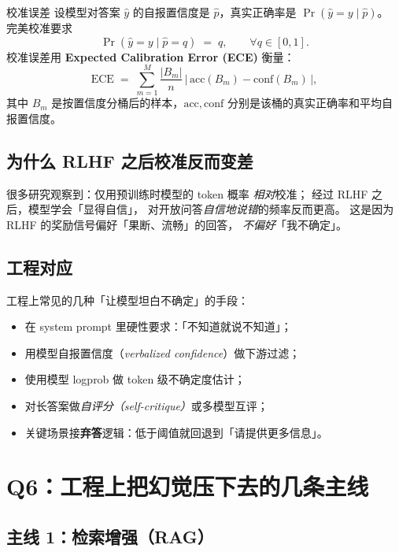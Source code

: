 \documentclass[11pt,a4paper]{ctexart}
\begin{document}
\begin{mathbox}{校准误差}
设模型对答案 $\hat y$ 的自报置信度是 $\hat p$，真实正确率是 $\Pr(\hat y = y \mid \hat p)$。
完美校准要求
\[
  \Pr(\hat y = y \mid \hat p = q) \;=\; q,\qquad \forall q \in [0,1].
\]
校准误差用 \textbf{Expected Calibration Error (ECE)} 衡量：
\[
  \mathrm{ECE}
  \;=\;
  \sum_{m=1}^{M} \frac{|B_m|}{n}\, \big|\,\mathrm{acc}(B_m) - \mathrm{conf}(B_m)\,\big|,
\]
其中 $B_m$ 是按置信度分桶后的样本，$\mathrm{acc}, \mathrm{conf}$ 分别是该桶的真实正确率和平均自报置信度。
\end{mathbox}

\subsection*{为什么 RLHF 之后校准反而变差}

很多研究观察到：仅用预训练时模型的 token 概率 \emph{相对}校准；
经过 RLHF 之后，模型学会「显得自信」，
对开放问答\emph{自信地说错}的频率反而更高。
这是因为 RLHF 的奖励信号偏好「果断、流畅」的回答，
\emph{不偏好}「我不确定」。

\subsection{工程对应}

\begin{engbox}
工程上常见的几种「让模型坦白不确定」的手段：
\begin{itemize}
  \item 在 system prompt 里硬性要求：「不知道就说不知道」；
  \item 用模型自报置信度（\emph{verbalized confidence}）做下游过滤；
  \item 使用模型 logprob 做 token 级不确定度估计；
  \item 对长答案做\emph{自评分（self-critique）}或多模型互评；
  \item 关键场景接\textbf{弃答}逻辑：低于阈值就回退到「请提供更多信息」。
\end{itemize}
\end{engbox}

\section{Q6：工程上把幻觉压下去的几条主线}

\subsection{主线 1：检索增强（RAG）}
\end{document}

